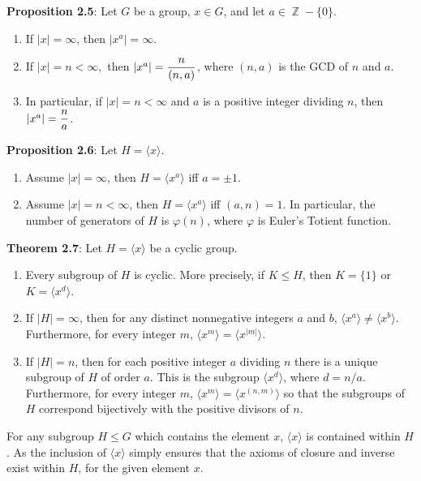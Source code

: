 \documentclass{article}
\DeclareMathOperator{\Z}{\mathbb{Z}}
\begin{document}
\textbf{Proposition 2.5}: Let $G$ be a group, $x \in G$, and let $a \in \Z - \{0\}$. \begin{enumerate}
    \item If $|x| = \infty$, then $|x^a| = \infty$.
    \item If $|x| = n < \infty,$ then $|x^a| = \mathlarger{\frac{n}{(n, a)}}$, where $(n, a)$ is the GCD of $n$ and $a$.
    \item In particular, if $|x| = n < \infty$ and $a$ is a positive integer dividing $n$, then $|x^a| = \mathlarger{\frac{n}{a}}$.
\end{enumerate} $ $ \\
\textbf{Proposition 2.6}: Let $H = \langle x \rangle$. \begin{enumerate}
    \item Assume $|x| = \infty$, then $H = \langle x^a \rangle$ iff $a = \pm 1$.
    \item Assume $|x| = n < \infty$, then $H = \langle x^a \rangle$ iff $(a, n) = 1$. In particular, the number of generators of $H$ is $\varphi(n)$, where $\varphi$ is Euler's Totient function.
\end{enumerate} $ $ \\
\textbf{Theorem 2.7}: Let $H = \langle x \rangle$ be a cyclic group. \begin{enumerate}
    \item Every subgroup of $H$ is cyclic. More precisely, if $K \leq H$, then $K = \{1\}$ or $K = \langle x^d \rangle$.
    \item If $|H| = \infty$, then for any distinct nonnegative integers $a$ and $b$, $\langle x^a \rangle \neq \langle x^b \rangle$. Furthermore, for every integer $m$, $\langle x^m \rangle = \langle x^{|m|} \rangle$.
    \item If $|H| = n$, then for each positive integer $a$ dividing $n$ there is a unique subgroup of $H$ of order $a$. This is the subgroup $\langle x^d \rangle$, where $d = n/a$. Furthermore, for every integer $m$, $\langle x^m \rangle = \langle x^{(n, m)} \rangle$ so that the subgroups of $H$ correspond bijectively with the positive divisors of $n$.
\end{enumerate} $ $ \\
For any subgroup $H \leq G$ which contains the element $x$, $\langle x \rangle$ is contained within $H$. As the inclusion of $\langle x \rangle$ simply ensures that the axioms of closure and inverse exist within $H$, for the given element $x$. \\ \\
\end{document}
